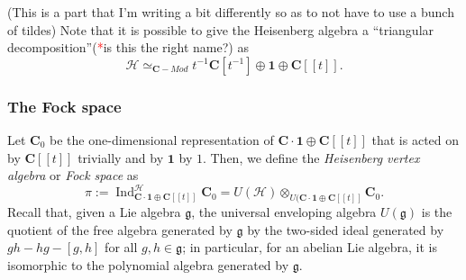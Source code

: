 \documentclass{article}
\newcommand{\CC}{\mathbold{C}}
\newcommand{\Hh}{\mathcal{H}}
\newcommand{\one}{\mathbold{1}}
\newcommand{\gf}{\mathfrak{g}}
\newcommand{\tk}{\textcolor{red}{*}}
\DeclareMathOperator{\Ind}{Ind}
\begin{document}
(This is a part that I'm writing a bit differently so as to not have to use a bunch of tildes)
Note that it is possible to give the Heisenberg algebra a ``triangular decomposition''(\tk is this the right name?) as 
\[\Hh \simeq_{\CC-Mod} t^{-1}\CC[t^{-1}] \oplus \one \oplus \CC[[t]].  \]

\subsubsection{The Fock space}
\label{sec:fockspace}

Let $\CC_0$ be the one-dimensional representation of $\CC \cdot\one \oplus \CC[[t]]$ that is acted on by $\CC[[t]]$ trivially and by $\one$ by $1$.  Then, we define the \textit{Heisenberg vertex algebra} or \textit{Fock space} as
\[\pi:=\Ind_{\CC \cdot \one \oplus \CC[[t]]}^\Hh\CC_0=U(\Hh) \otimes_{U(\CC \cdot \one \oplus \CC[[t]]}\CC_0. \]
Recall that, given a Lie algebra $\gf$, the universal enveloping algebra $U(\gf)$ is the quotient of the free algebra generated by $\gf$ by the two-sided ideal generated by $gh-hg-[g,h]$ for all $g,h \in \gf$; in particular, for an abelian Lie algebra, it is isomorphic to the polynomial algebra generated by $\gf$.
\end{document}
